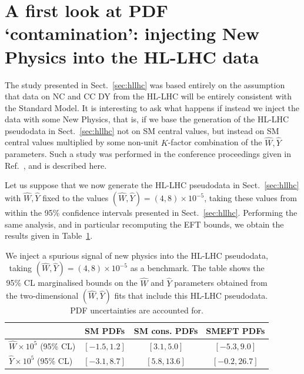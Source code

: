 \documentclass[withindex,glossary]{cam-thesis}
\begin{document}
\section{A first look at PDF `contamination': injecting New Physics into the HL-LHC data}
\label{sec:hllhc_extension}

The study presented in Sect.~\ref{sec:hllhc} was based entirely on the assumption that data on NC and CC DY from the HL-LHC will be entirely consistent with the Standard Model. It is interesting to ask what happens if instead we inject the data with some New Physics, that is, if we base the generation of the HL-LHC pseudodata in Sect.~\ref{sec:hllhc} not on SM central values, but instead on SM central values multiplied by some non-unit $K$-factor combination of the $\hat{W}, \hat{Y}$ parameters. Such a study was performed in the conference proceedings given in Ref.~\cite{Madigan:2021uho}, and is described here.

Let us suppose that we now generate the HL-LHC pseudodata in Sect.~\ref{sec:hllhc} with $\hat{W},\hat{Y}$ fixed to the values $(\hat{W}, \hat{Y}) = (4,8) \times 10^{-5}$, taking these values from within the 95\% confidence intervals presented in Sect.~\ref{sec:hllhc}. Performing the same analysis, and in particular recomputing the EFT bounds, we obtain the results given in Table~\ref{tab:hllhc_w_y_bounds}.

\begin{table}[H]
 \renewcommand{\arraystretch}{1.40}
  \centering
  \begin{tabular}{l|c|c|c}
    & SM PDFs & SM cons. PDFs  & SMEFT PDFs \\
    \hline
    $\hat{W}\times 10^5$ (95\% CL)& $[-1.5,1.2]$ & $[3.1,5.0]$ & $[-5.3,9.0]$ \\
    \hline
   $\hat{Y}\times 10^5$ (95\% CL) & $[-3.1,8.7]$ & $[5.8,13.6]$ & $[-0.2,26.7]$  \\
    \hline
  \end{tabular}
  \caption{ \label{tab:hllhc_w_y_bounds}\small
    We inject a spurious signal of new physics into the HL-LHC pseudodata, taking $(\hat{W},\hat{Y}) = (4,8) \times 10^{-5}$ as a benchmark. The table shows the 95\% CL marginalised bounds on the $\hat{W}$ and $\hat{Y}$ parameters
obtained from the two-dimensional $(\hat{W},\hat{Y})$ fits that include this HL-LHC pseudodata. PDF uncertainties are
accounted for.
}
\end{table}
\end{document}
